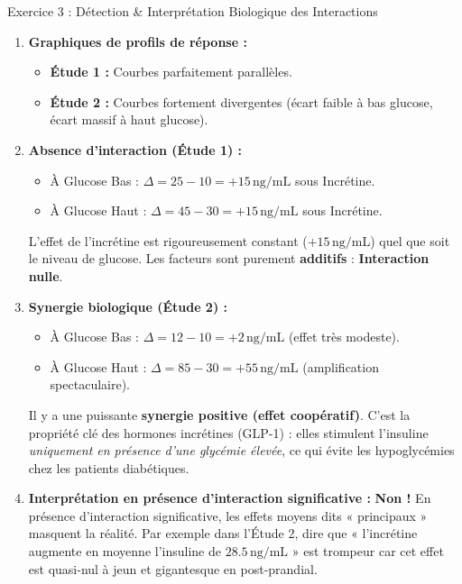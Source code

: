 \documentclass[11pt,a4paper]{article}
\begin{document}
\begin{solutionbox}{Exercice 3 : Détection \& Interprétation Biologique des Interactions}
\begin{enumerate}[label=\textbf{\alph*.}]
  \item \textbf{Graphiques de profils de réponse :}
  \begin{itemize}
    \item \textbf{Étude 1 :} Courbes parfaitement parallèles.
    \item \textbf{Étude 2 :} Courbes fortement divergentes (écart faible à bas glucose, écart massif à haut glucose).
  \end{itemize}

  \item \textbf{Absence d'interaction (Étude 1) :}
  \begin{itemize}
    \item À Glucose Bas : $\Delta = 25 - 10 = +15\,\text{ng/mL}$ sous Incrétine.
    \item À Glucose Haut : $\Delta = 45 - 30 = +15\,\text{ng/mL}$ sous Incrétine.
  \end{itemize}
  L'effet de l'incrétine est rigoureusement constant ($+15\,\text{ng/mL}$) quel que soit le niveau de glucose. Les facteurs sont purement \textbf{additifs} : \textbf{Interaction nulle}.

  \item \textbf{Synergie biologique (Étude 2) :}
  \begin{itemize}
    \item À Glucose Bas : $\Delta = 12 - 10 = +2\,\text{ng/mL}$ (effet très modeste).
    \item À Glucose Haut : $\Delta = 85 - 30 = +55\,\text{ng/mL}$ (amplification spectaculaire).
  \end{itemize}
  Il y a une puissante \textbf{synergie positive (effet coopératif)}. C'est la propriété clé des hormones incrétines (GLP-1) : elles stimulent l'insuline \textit{uniquement en présence d'une glycémie élevée}, ce qui évite les hypoglycémies chez les patients diabétiques.

  \item \textbf{Interprétation en présence d'interaction significative :}
  \textbf{Non !} En présence d'interaction significative, les effets moyens dits « principaux » masquent la réalité. Par exemple dans l'Étude 2, dire que « l'incrétine augmente en moyenne l'insuline de $28.5\,\text{ng/mL}$ » est trompeur car cet effet est quasi-nul à jeun et gigantesque en post-prandial.
\end{enumerate}
\end{solutionbox}
\end{document}
